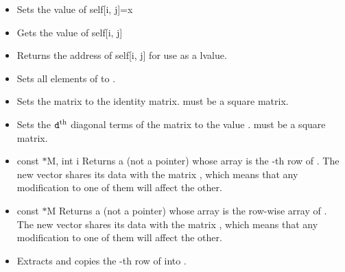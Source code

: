 \begin{itemize}
\item {}
  \sshortdescribe Sets the value of self[i, j]=x  

\item {}
  \sshortdescribe Gets the value of self[i, j]  

\item {}
  \sshortdescribe Returns the address of self[i, j] for use as a lvalue.

\item {}
  \sshortdescribe Sets all elements of  to .
  
\item {}
  \sshortdescribe Sets the matrix  to the identity
  matrix.  must be a square matrix.

\item {}
  \sshortdescribe Sets the ${\tt d}^{\text{th}}$ diagonal terms of the matrix
   to the value .  must be a square matrix.

\item {}
  {const  $\ast$M, int i}
  \sshortdescribe Returns a  (not a pointer) whose array is
  the -th row of . The new vector shares its data with the
  matrix , which means that any modification to one of them will affect
  the other.
  
\item {}
  {const  $\ast$M}
  \sshortdescribe Returns a  (not a pointer) whose array is
  the row-wise array of . The new vector shares its data with the
  matrix , which means that any modification to one of them will affect
  the other.

\item {}
  \sshortdescribe Extracts and copies the -th row of  into
  .


\end{itemize}
